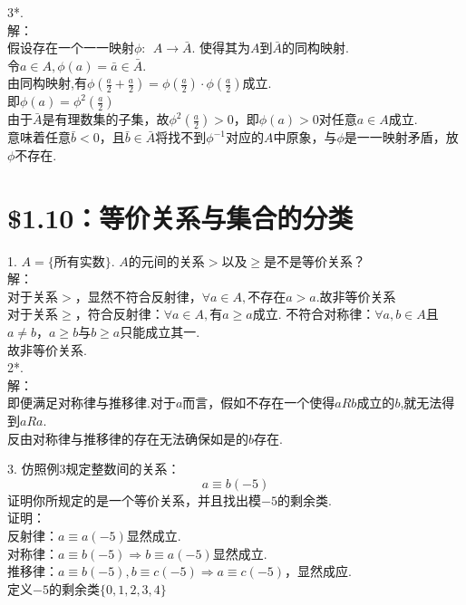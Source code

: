 \documentclass{ctexart}
\begin{document}
3*.\\
解：\\
假设存在一个一一映射$\phi: \ \ A \rightarrow \bar{A}$. 使得其为$A$到$\bar{A}$的同构映射. \\
令$a \in A, \phi(a)=\bar{a} \in \bar{A}$. \\
由同构映射,有$\phi(\frac{a}{2}+\frac{a}{2})=\phi(\frac{a}{2})\cdot \phi(\frac{a}{2})$成立. \\
即$\phi(a)=\phi^2(\frac{a}{2})$ \\
由于$\bar{A}$是有理数集的子集，故$\phi^2(\frac{a}{2})>0$，即$\phi(a)>0$对任意$a \in A$成立. \\
意味着任意$\bar{b}<0$，且$\bar{b} \in \bar{A}$将找不到$\phi^{-1}$对应的$A$中原象，与$\phi$是一一映射矛盾，放$\phi$不存在.
\section*{\$1.10：等价关系与集合的分类}
1. $A=\{$所有实数$\}$. $A$的元间的关系$>$以及$\geq$是不是等价关系？ \\
解：\\
对于关系$>$，显然不符合反射律，$ \forall a \in A, $不存在$ a>a $.故非等价关系
\\
对于关系$\geq$，符合反射律：$ \forall a \in A, $有$a \geq a$成立. 
不符合对称律：$\forall a,b \in A$且$a \neq b$，$a \geq b$与$b \geq a$只能成立其一.\\
故非等价关系.\\

2*. \\
解：\\
即便满足对称律与推移律.对于$a$而言，假如不存在一个使得$aRb$成立的$b$,就无法得到$aRa$.\\
反由对称律与推移律的存在无法确保如是的$b$存在.

3. 仿照例3规定整数间的关系：
\begin{equation*}
	a \equiv b (-5)
\end{equation*}
证明你所规定的是一个等价关系，并且找出模$-5$的剩余类.\\
证明： \\
反射律：$a \equiv a(-5)$显然成立. \\
对称律：$a \equiv b(-5) \Rightarrow b \equiv a(-5)$显然成立. \\
推移律：$a \equiv b(-5), b \equiv c(-5) \Rightarrow a \equiv c(-5)$，显然成应.\\
定义$-5$的剩余类$\{0,1,2,3,4\}$
\end{document}
